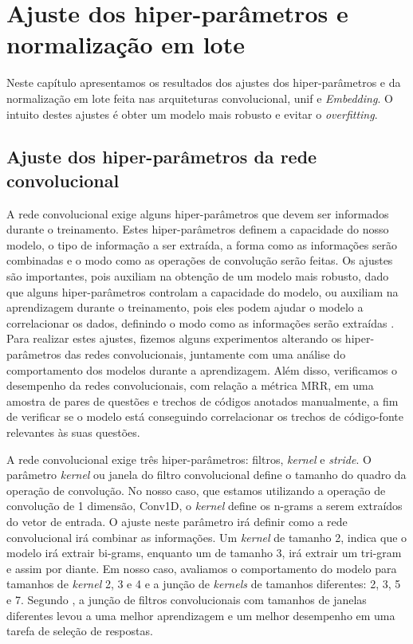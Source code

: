 \chapter{Ajuste dos hiper-parâmetros e normalização em lote}
\label{ape:ajuste-hiper-parametros-cnn}

Neste capítulo apresentamos os resultados dos ajustes dos hiper-parâmetros e da normalização em lote feita nas arquiteturas convolucional, \Gls{unif} e \textit{Embedding}. O intuito destes ajustes é obter um modelo mais robusto e evitar o \textit{overfitting}.

\section{Ajuste dos hiper-parâmetros da rede convolucional}
\label{sec:ajuste-hiper-parametros-cnn}

A rede convolucional exige alguns hiper-parâmetros que devem ser informados durante o treinamento. Estes hiper-parâmetros definem a capacidade do nosso modelo, o tipo de informação a ser extraída, a forma como as informações serão combinadas e o modo como as operações de convolução serão feitas. Os ajustes são importantes, pois auxiliam na obtenção de um modelo mais robusto, dado que alguns hiper-parâmetros controlam a capacidade do modelo, ou auxiliam na aprendizagem durante o treinamento, pois eles podem ajudar o modelo a correlacionar os dados, definindo o modo como as informações serão extraídas \citep{bengio-hyper-parameter-optimization-2012}. Para realizar estes ajustes, fizemos alguns experimentos alterando os hiper-parâmetros das redes convolucionais, juntamente com uma análise do comportamento dos modelos durante a aprendizagem. Além disso, verificamos o desempenho da redes convolucionais, com relação a métrica MRR, em uma amostra de pares de questões e trechos de códigos anotados manualmente, a fim de verificar se o modelo está conseguindo correlacionar os trechos de código-fonte relevantes às suas questões.

A rede convolucional exige três hiper-parâmetros: filtros, \textit{kernel} e \textit{stride}.
O parâmetro \textit{kernel} ou janela do filtro convolucional define o tamanho do quadro da operação de convolução. No nosso caso, que estamos utilizando a operação de convolução de 1 dimensão, Conv1D, o \textit{kernel} define os n-grams a serem extraídos do vetor de entrada. O ajuste neste parâmetro irá definir como a rede convolucional irá combinar as informações. Um \textit{kernel} de tamanho 2, indica que o modelo irá extrair bi-grams, enquanto um de tamanho 3, irá extrair um tri-gram e assim por diante. Em nosso caso, avaliamos o comportamento do modelo para tamanhos de \textit{kernel} 2, 3 e 4 e a junção de \textit{kernels} de tamanhos diferentes: 2, 3, 5 e 7. Segundo \cite{wen-joint-modeling-question-answer-2019}, a junção de filtros convolucionais com tamanhos de janelas diferentes levou a uma melhor aprendizagem e um melhor desempenho em uma tarefa de seleção de respostas.




